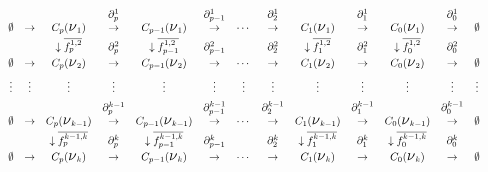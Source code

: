 \documentclass[12pt, a4paper]{article}
\numberwithin{equation}{section}
\theoremstyle{definition}
\theoremstyle{remark}
\theoremstyle{plain}
\begin{document}
	\begin{equation*}
		\resizebox{\textwidth}{!}{$ 
		\begin{array}{ccccccccccccc}
			 & & & \partial_{p}^{1} &  & 
			\partial_{p-1}^{1} &  & \partial_{2}^{1}&  & 
			\partial_{1}^{1}&  & 
			\partial_{0}^{1} & \\ 
			\emptyset & \rightarrow & C_{p}(
			\text{{\Large $\nu$}$_{1}$}) & \rightarrow & C_{p-1}(
			\text{{\Large $\nu$}$_{1}$}) & \rightarrow &\cdots & 
			\rightarrow & C_{1}(
			\text{{\Large $\nu$}$_{1}$})& \rightarrow & C_{0}(
			\text{{\Large $\nu$}$_{1}$})& \rightarrow & 
			\emptyset\\[3pt]

			& & \downarrow \overline{f_{p}^{1,2}}& \partial_{p}^{2} & 
			\downarrow \overline{f_{p-1}^{1,2}}& \partial_{p-1}^{2} 
			& & \partial_{2}^{2} & \downarrow \overline{f_{1}^{1,2}}
			& \partial_{1}^{2} & \downarrow \overline{f_{0}^{1,2}} & 
			\partial_{0}^{2} & \\ [3pt]	
			\emptyset & \rightarrow & C_{p}(
			\text{{\Large $\nu$}$_{2}$}) & \rightarrow & C_{p-1}(
			\text{{\Large $\nu$}$_{2}$}) & \rightarrow &\cdots & 
			\rightarrow & C_{1}(
			\text{{\Large $\nu$}$_{2}$})& \rightarrow & C_{0}(
			\text{{\Large $\nu$}$_{2}$})& \rightarrow & 
			\emptyset \\[5pt]
			
			\vdots & \vdots & \vdots & \vdots & \vdots & \vdots & 
			\vdots & \vdots & \vdots & \vdots & \vdots & \vdots & 
			\vdots \\[5pt]
			
			& & & \partial_{p}^{k-1} &  & 
			\partial_{p-1}^{k-1} &  & \partial_{2}^{k-1}&  & 
			\partial_{1}^{k-1}&  & 
			\partial_{0}^{k-1} & \\ 
			\emptyset & \rightarrow & C_{p}(
			\text{{\Large $\nu$}$_{k-1}$}) & \rightarrow & C_{p-1}(
			\text{{\Large $\nu$}$_{k-1}$}) & \rightarrow &\cdots & 
			\rightarrow & C_{1}(
			\text{{\Large $\nu$}$_{k-1}$})& \rightarrow & C_{0}(
			\text{{\Large $\nu$}$_{k-1}$})& \rightarrow & 
			\emptyset\\[3pt]

			& & \downarrow \overline{f_{p}^{k-1,k}}& \partial_{p}^{k} & 
			\downarrow \overline{f_{p-1}^{k-1,k}}& \partial_{p-1}^{k} 
			& & \partial_{2}^{k} & \downarrow \overline{f_{1}^{k-1,k}}
			& \partial_{1}^{k} & \downarrow \overline{f_{0}^{k-1,k}} & 
			\partial_{0}^{k} & \\ [3pt]	
			\emptyset & \rightarrow & C_{p}(
			\text{{\Large $\nu$}$_{k}$}) & \rightarrow & C_{p-1}(
			\text{{\Large $\nu$}$_{k}$}) & \rightarrow &\cdots & 
			\rightarrow & C_{1}(
			\text{{\Large $\nu$}$_{k}$})& \rightarrow & C_{0}(
			\text{{\Large $\nu$}$_{k}$})& \rightarrow & \emptyset \\
		\end{array}$}
	\end{equation*}
\end{document}
